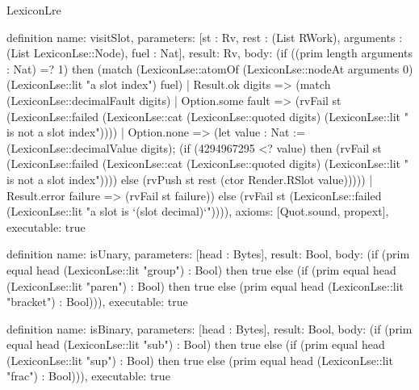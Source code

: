 \begin{lexlean}{LexiconLre}
\begin{semanticmodule}
definition{
  name: visitSlot,
  parameters: [st : Rv, rest : (List RWork), arguments : (List LexiconLse::Node), fuel : Nat],
  result: Rv,
  body: (if ((prim length arguments : Nat) =? 1) then (match (LexiconLse::atomOf (LexiconLse::nodeAt arguments 0) (LexiconLse::lit "a slot index") fuel)
    | Result.ok digits => (match (LexiconLse::decimalFault digits)
      | Option.some fault => (rvFail st (LexiconLse::failed (LexiconLse::cat (LexiconLse::quoted digits) (LexiconLse::lit " is not a slot index"))))
      | Option.none => (let value : Nat := (LexiconLse::decimalValue digits); (if (4294967295 <? value) then (rvFail st (LexiconLse::failed (LexiconLse::cat (LexiconLse::quoted digits) (LexiconLse::lit " is not a slot index")))) else (rvPush st rest (ctor Render.RSlot value)))))
    | Result.error failure => (rvFail st failure)) else (rvFail st (LexiconLse::failed (LexiconLse::lit "a slot is `(slot decimal)`")))),
  axioms: [Quot.sound, propext],
  executable: true
}

definition{
  name: isUnary,
  parameters: [head : Bytes],
  result: Bool,
  body: (if (prim equal head (LexiconLse::lit "group") : Bool) then true else (if (prim equal head (LexiconLse::lit "paren") : Bool) then true else (prim equal head (LexiconLse::lit "bracket") : Bool))),
  executable: true
}

definition{
  name: isBinary,
  parameters: [head : Bytes],
  result: Bool,
  body: (if (prim equal head (LexiconLse::lit "sub") : Bool) then true else (if (prim equal head (LexiconLse::lit "sup") : Bool) then true else (prim equal head (LexiconLse::lit "frac") : Bool))),
  executable: true
}


\end{semanticmodule}
\end{lexlean}

